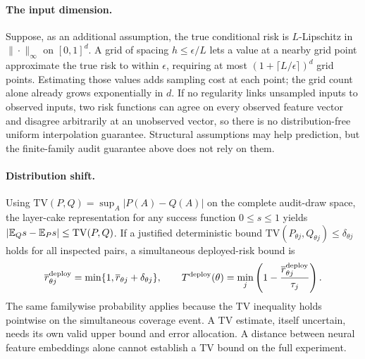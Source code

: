 \paragraph{The input dimension.}
Suppose, as an additional assumption, the true conditional risk is
$L$-Lipschitz in $\|\cdot\|_\infty$ on $[0,1]^d$. A grid of spacing
$h\leq\epsilon/L$ lets a value at a nearby grid point approximate the
true risk to within $\epsilon$, requiring at most
$(1+\lceil L/\epsilon\rceil)^d$ grid points. Estimating those values adds
sampling cost at each point; the grid count alone already grows exponentially
in $d$. If no regularity links unsampled inputs to observed inputs, two risk
functions can agree on every observed feature vector and disagree arbitrarily
at an unobserved vector, so there is no distribution-free uniform interpolation
guarantee. Structural assumptions may help prediction, but the finite-family
audit guarantee above does not rely on them.

\paragraph{Distribution shift.}
Using $\mathrm{TV}(P,Q)=\sup_A|P(A)-Q(A)|$ on the complete audit-draw space,
the layer-cake representation for any success function $0\leq s\leq1$ yields
$|\mathbb{E}_Qs-\mathbb{E}_Ps|\leq\mathrm{TV}(P,Q)$. If a justified deterministic bound
$\mathrm{TV}(P_{\theta j},Q_{\theta j})\leq\delta_{\theta j}$ holds for
all inspected pairs, a simultaneous deployed-risk bound is
\begin{equation}
 \overline r^{\rm deploy}_{\theta j}
 =\min\{1,\overline r_{\theta j}+\delta_{\theta j}\},\qquad
 T^{\rm deploy}(\theta)=\min_j\left(1-
 \frac{\overline r^{\rm deploy}_{\theta j}}{\tau_j}\right).
 \label{eq:neural-shift}
\end{equation}
The same familywise probability applies because the TV inequality holds
pointwise on the simultaneous coverage event. A TV estimate, itself uncertain,
needs its own valid upper bound and error allocation. A distance between neural
feature embeddings alone cannot establish a TV bound on the full experiment.
